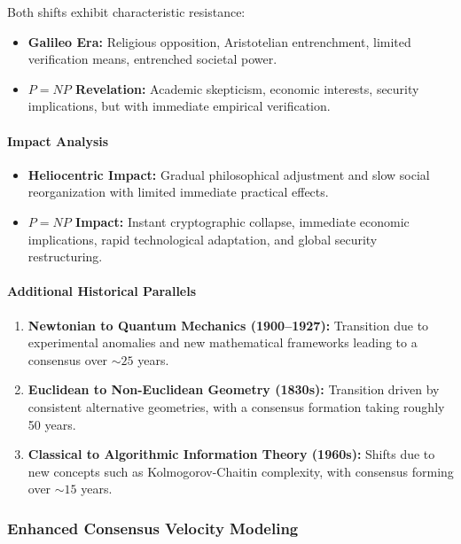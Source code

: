 \documentclass[11pt]{article}
\begin{document}
Both shifts exhibit characteristic resistance:
\begin{itemize}
    \item \textbf{Galileo Era:} Religious opposition, Aristotelian entrenchment, limited verification means, entrenched societal power.
    \item \textbf{$P=NP$ Revelation:} Academic skepticism, economic interests, security implications, but with immediate empirical verification.
\end{itemize}

\paragraph{Impact Analysis}

\begin{itemize}
    \item \textbf{Heliocentric Impact:} Gradual philosophical adjustment and slow social reorganization with limited immediate practical effects.
    \item \textbf{$P=NP$ Impact:} Instant cryptographic collapse, immediate economic implications, rapid technological adaptation, and global security restructuring.
\end{itemize}

\paragraph{Additional Historical Parallels}
\begin{enumerate}[label=(\arabic*)]
    \item \textbf{Newtonian to Quantum Mechanics (1900--1927):} Transition due to experimental anomalies and new mathematical frameworks leading to a consensus over $\sim25$ years.
    \item \textbf{Euclidean to Non-Euclidean Geometry (1830s):} Transition driven by consistent alternative geometries, with a consensus formation taking roughly 50 years.
    \item \textbf{Classical to Algorithmic Information Theory (1960s):} Shifts due to new concepts such as Kolmogorov-Chaitin complexity, with consensus forming over $\sim15$ years.
\end{enumerate}

\subsubsection{Enhanced Consensus Velocity Modeling}
\end{document}
